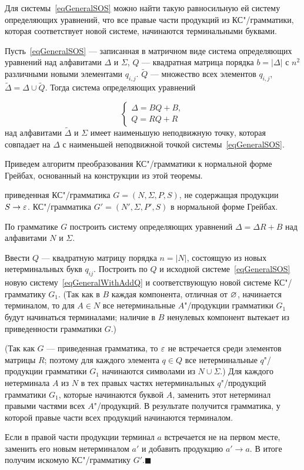 Для системы~\eqref{eqGeneralSOS} можно найти такую равносильную ей систему определяющих уравнений, что все правые части продукций из КС"/грамматики, которая соответствует новой системе, начинаются терминальными буквами.

\begin{mytheorem}
Пусть~\eqref{eqGeneralSOS} --- записанная в матричном виде система определяющих уравнений над алфавитами $\Delta$ и $\Sigma$, $Q$ --- квадратная матрица порядка $b=|\Delta |$ с $n^2$ различными новыми элементами $q_{i,j}$. $\widetilde Q$ --- множество всех элементов $q_{i,j}$, $\widetilde\Delta = \Delta \cup \widetilde Q$. Тогда система определяющих уравнений

\begin{equation}
\label{eqGeneralWithAddQ}
\begin{cases}
	\Delta = BQ + B, \\
    Q = RQ + R
\end{cases}
\end{equation}
над алфавитами $\widetilde\Delta$ и $\Sigma$ имеет наименьшую неподвижную точку, которая совпадает на $\Delta$ с наименьшей неподвижной точкой системы~\eqref{eqGeneralSOS}.
\end{mytheorem}

Приведем алгоритм преобразования КС"/грамматики к нормальной форме Грейбах, основанный на конструкции из этой теоремы.

{\label{algo-Greybah}приведенная КС"/грамматика $G=(N,\Sigma,P,S)$, не содержащая продукции $S\to\varepsilon$.}
{КС"/грамматика $G'=(N',\Sigma,P',S)$ в нормальной форме Грейбах.}
{
\item По грамматике $G$ построить систему определяющих уравнений $\Delta=\Delta R+B$ над алфавитами $N$ и $\Sigma$.

\item Ввести $Q$ --- квадратную матрицу порядка $n=|N|$, состоящую из новых нетерминальных букв $q_{ij}$. Построить по $Q$ и исходной системе~\eqref{eqGeneralSOS} новую систему~\eqref{eqGeneralWithAddQ} и соответствующую новой системе КС"/грамматику $G_1$. (Так как в $B$ каждая компонента, отличная от $\varnothing$, начинается терминалом, то для $A\in N$ все нетерминальные $A$"/продукции грамматики $G_1$ будут начинаться терминалами; наличие в $B$ ненулевых компонент вытекает из приведенности грамматики $G$.)

\item (Так как $G$ --- приведенная грамматика, то $\varepsilon$ не встречается среди элементов матрицы $R$; поэтому для каждого элемента $q\in Q$ все нетерминальные $q$"/продукции грамматики $G_1$ начинаются символами из $N\cup\Sigma$.) Для каждого нетерминала $A$ из $N$ в тех правых частях нетерминальных $q$"/продукций грамматики $G_1$, которые начинаются буквой $A$, заменить этот нетерминал правыми частями всех $A$"/продукций. В результате получится грамматика, у которой правые части всех продукций начинаются терминалом.

\item Если в правой части продукции терминал $a$ встречается не на первом месте, заменить его новым нетерминалом $a'$ и добавить продукцию $a'\to a$. В итоге получим искомую КС"/грамматику $G'$.$\blacksquare$
}

